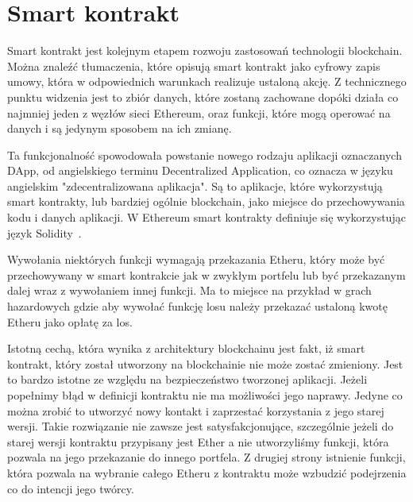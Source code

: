 \documentclass[]{llncs}
\renewcommand{\cite}[1]{~\oldcite{#1}}
\begin{document}
\section{Smart kontrakt}

  Smart kontrakt jest kolejnym etapem rozwoju zastosowań technologii blockchain.
  Można znaleźć tłumaczenia, które opisują smart kontrakt jako cyfrowy zapis
  umowy, która w odpowiednich warunkach realizuje ustaloną akcję. Z technicznego
  punktu widzenia jest to zbiór danych, które zostaną zachowane dopóki działa
  co najmniej jeden z węzłów sieci Ethereum, oraz funkcji, które mogą operować na
  danych i są jedynym sposobem na ich zmianę.

  Ta funkcjonalność spowodowała powstanie nowego rodzaju aplikacji oznaczanych
  DApp, od angielskiego terminu Decentralized Application, co oznacza w języku
  angielskim "zdecentralizowana aplikacja". Są to aplikacje, które wykorzystują
  smart kontrakty, lub bardziej ogólnie blockchain, jako miejsce do
  przechowywania kodu i danych aplikacji. W Ethereum smart kontrakty definiuje
  się wykorzystując język Solidity\cite{solidity}.

  Wywołania niektórych funkcji wymagają przekazania Etheru, który może być
  przechowywany w smart kontrakcie jak w zwykłym portfelu lub być przekazanym
  dalej wraz z wywołaniem innej funkcji. Ma to miejsce na przykład w grach
  hazardowych gdzie aby wywołać funkcję losu należy przekazać ustaloną kwotę
  Etheru jako opłatę za los.

  Istotną cechą, która wynika z architektury blockchainu jest fakt, iż smart
  kontrakt, który został utworzony na blockchainie nie może zostać zmieniony.
  Jest to bardzo istotne ze względu na bezpieczeństwo tworzonej aplikacji.
  Jeżeli popełnimy błąd w definicji kontraktu nie ma możliwości jego naprawy.
  Jedyne co można zrobić to utworzyć nowy kontakt i zaprzestać korzystania z
  jego starej wersji. Takie rozwiązanie nie zawsze jest satysfakcjonujące,
  szczególnie jeżeli do starej wersji kontraktu przypisany jest Ether a nie
  utworzyliśmy funkcji, która pozwala na jego przekazanie do innego portfela. Z
  drugiej strony istnienie funkcji, która pozwala na wybranie całego Etheru z
  kontraktu może wzbudzić podejrzenia co do intencji jego twórcy.
\end{document}
